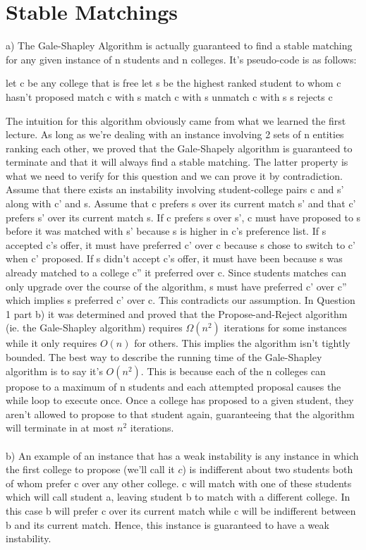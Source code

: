 \documentclass{article}
\begin{document}
\section{Stable Matchings}
a) The Gale-Shapley Algorithm is actually guaranteed to find a stable matching for any given instance of n students and n colleges. It's pseudo-code is as follows:
\begin{algorithmic}
    \STATE let c be any college that is free
    \STATE let s be the highest ranked student to whom c hasn't proposed
            match c with s
        \ELSE
                \STATE match c with s 
                \STATE unmatch c with s
            \ELSE
                \STATE s rejects c
        \ENDIF
\ENDWHILE
\end{algorithmic}
The intuition for this algorithm obviously came from what we learned the first lecture. As long as we're dealing with an instance involving 2 sets of n entities ranking each other, we proved that the Gale-Shapely algorithm is guaranteed to terminate and that it will always find a stable matching. The latter property is what we need to verify for this question and we can prove it by contradiction. Assume that there exists an instability involving student-college pairs c and s' along with c' and s. Assume that c prefers s over its current match s' and that c' prefers s' over its current match s. If c prefers s over s', c must have proposed to s before it was matched with s' because s is higher in c's preference list. If s accepted c's offer, it must have preferred c' over c because s chose to switch to c' when c' proposed. If s didn't accept c's offer, it must have been because s was already matched to a college c'' it preferred over c. Since students matches can only upgrade over the course of the algorithm, s must have preferred c' over c'' which implies s preferred c' over c. This contradicts our assumption. In Question 1 part b) it was determined and proved that the Propose-and-Reject algorithm (ie. the Gale-Shapley algorithm) requires $\Omega(n^2)$ iterations for some instances while it only requires $O(n)$ for others. This implies the algorithm isn't tightly bounded. The best way to describe the running time of the Gale-Shapley algorithm is to say it's $O(n^2)$. This is because each of the n colleges can propose to a maximum of n students and each attempted proposal causes the while loop to execute once. Once a college has proposed to a given student, they aren't allowed to propose to that student again, guaranteeing that the algorithm will terminate in at most $n^2$ iterations.\\\\
b) An example of an instance that has a weak instability is any instance in which the first college to propose (we'll call it $c$) is indifferent about two students both of whom prefer c over any other college. c will match with one of these students which will call student a, leaving student b to match with a different college. In this case b will prefer c over its current match while c will be indifferent between b and its current match. Hence, this instance is guaranteed to have a weak instability. 
\end{document}
